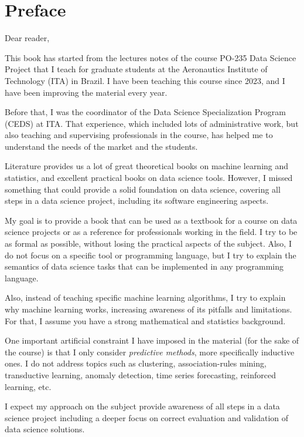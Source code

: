 \chapter{Preface}

\noindent Dear reader, \vspace{1em}

This book has started from the lectures notes of the course PO-235 Data Science Project
that I teach for graduate students at the Aeronautics Institute of Technology (ITA) in
Brazil.  I have been teaching this course since 2023, and I have been improving the
material every year.

Before that, I was the coordinator of the Data Science Specialization Program (CEDS) at
ITA.  That experience, which included lots of administrative work, but also teaching and
supervising professionals in the course, has helped me to understand the needs of the
market and the students.

Literature provides us a lot of great theoretical books on machine learning and
statistics, and excellent practical books on data science tools.  However, I missed
something that could provide a solid foundation on data science, covering all steps in a
data science project, including its software engineering aspects.

My goal is to provide a book that can be used as a textbook for a course on data science
projects or as a reference for professionals working in the field.  I try to be as
formal as possible, without losing the practical aspects of the subject.  Also, I do not
focus on a specific tool or programming language, but I try to explain the semantics of
data science tasks that can be implemented in any programming language.

Also, instead of teaching specific machine learning algorithms, I try to explain why
machine learning works, increasing awareness of its pitfalls and limitations.
For that, I assume you have a strong mathematical and statistics background.

One important artificial constraint I have imposed in the material (for the sake of the
course) is that I only consider \emph{predictive methods}, more specifically inductive
ones.  I do not address topics such as clustering, association-rules mining, transductive
learning, anomaly detection, time series forecasting, reinforced learning, etc.

I expect my approach on the subject provide awareness of all steps in a data science
project including a deeper focus on correct evaluation and validation of data science
solutions.

